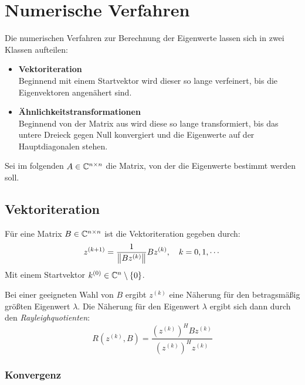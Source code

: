     \section{Numerische Verfahren}
        Die numerischen Verfahren zur Berechnung der Eigenwerte lassen sich in zwei Klassen aufteilen:
        \begin{itemize}
        	\item \textbf{Vektoriteration} \\ Beginnend mit einem Startvektor wird dieser so lange verfeinert, bis die Eigenvektoren angenähert sind.
        	\item \textbf{Ähnlichkeitstransformationen} \\ Beginnend von der Matrix aus wird diese so lange transformiert, bis das untere Dreieck gegen Null konvergiert und die Eigenwerte auf der Hauptdiagonalen stehen.
        \end{itemize}
    
        Sei im folgenden \( A \in \mathbb{C}^{ n \times n } \) die Matrix, von der die Eigenwerte bestimmt werden soll.

        \subsection{Vektoriteration}
            Für eine Matrix \( B \in \mathbb{C}^{n \times n} \) ist die Vektoriteration gegeben durch:
            \begin{equation*}
	            z^{(k + 1)} = \frac{1}{\norm{Bz^{(k)}}} Bz^{(k)}, \quad k = 0, 1, \cdots
            \end{equation*}
            Mit einem Startvektor \( k^{(0)} \in \mathbb{C}^n \setminus \{0\} \).
            
            Bei einer geeigneten Wahl von \(B\) ergibt \(z^{(k)}\) eine Näherung für den betragsmäßig größten Eigenwert \(\lambda\). Die Näherung für den Eigenwert \(\lambda\) ergibt sich dann durch den \textit{Rayleighquotienten}:
            \begin{equation*}
	            R(z^{(k)}, B) = \frac{(z^{(k)})^H B z^{(k)}}{(z^{(k)})^H z^{(k)}}
            \end{equation*}

            \subsubsection{Konvergenz}
	            \label{sec:eqconvergence}
            

